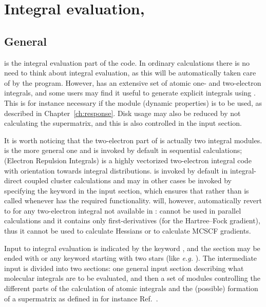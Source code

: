 \chapter{Integral evaluation, {\her}}\label{ch:hermit}

\section{General}\label{sec:herminp}

    {\her} is the integral evaluation part of the code. In ordinary
calculations there is no need to think about integral evaluation, as
this will be automatically taken care of by the program. However,
{\her} has an extensive set of atomic one- and two-electron
integrals,
and some users may find it useful to generate explicit integrals using
{\her}. This is for instance necessary if the {\resp} module (dynamic
properties) is to be
used, as described in Chapter~\ref{ch:response}. Disk usage may also
be reduced by not calculating the
supermatrix, and this is also controlled in the
 input section.

It is worth noticing that the two-electron part of {\her} is actually
two integral modules. {\twoint} is the more general one and is invoked by
default in sequential calculations; {\eri} (Electron Repulsion
Integrals) is a highly vectorized two-electron integral code with
orientation towards integral distributions. {\eri} is
invoked by default in integral-direct coupled cluster calculations and
may in other cases be invoked by specifying the  keyword
in the  input section, which ensures that {\eri}
rather than {\twoint} is called whenever {\eri} has the required
functionality. {\dalton} will, however, automatically revert to
{\twoint} for any two-electron integral not available in {\eri}:
{{\eri} cannot be used in parallel
calculations and it contains only first-derivatives (for
the Hartree--Fock gradient), thus it cannot be used to calculate
Hessians or to calculate MCSCF gradients.}

    Input to integral evaluation is
indicated by the keyword , and the section may be
ended with  or any keyword starting with two stars
(like {\it e.g.\/} ). The intermediate input is
divided into two sections: one general input section describing
what molecular integrals are to be evaluated, and then a set of
modules controlling the different parts of the calculation of
atomic integrals and the (possible) formation of
a supermatrix as defined in for instance Ref.~\cite{pemsjaahborjcp74}.


